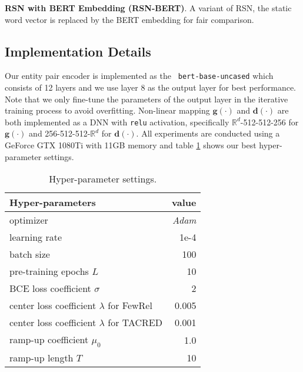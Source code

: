 \documentclass[11pt]{article}
\begin{document}
        \noindent\textbf{RSN with BERT Embedding (RSN-BERT)}. A variant of RSN, the static word vector is replaced by the BERT embedding for fair comparison.
        


    \subsection{Implementation Details}
        Our entity pair encoder is implemented as the \texttt{ bert-base-uncased} which consists of 12 layers and we use layer 8 as the output layer for best performance. Note that we only fine-tune the parameters of the output layer in the iterative training process to avoid overfitting. Non-linear mapping $\bm{g}(\cdot)$ and $\bm{d}(\cdot)$ are both implemented as a DNN with \texttt{relu} activation, specifically $\mathbb{R}^d$-512-512-256 for $\bm{g}(\cdot)$ and 256-512-512-$\mathbb{R}^d$ for $\bm{d}(\cdot)$. All experiments are conducted using a GeForce GTX 1080Ti with 11GB memory and table \ref{tab:hyper} shows our best hyper-parameter settings.
        \begin{table}
            \centering
            \begin{tabular}{lr}
            \toprule
            Hyper-parameters & value\\
            \midrule
            optimizer & \textit{Adam}\\
            learning rate & 1e-4\\
            batch size & 100\\
            \midrule
            pre-training epochs $L$ & 10\\
            BCE loss coefficient $\sigma$ & 2\\
            center loss coefficient $\lambda$ for FewRel & 0.005\\
            center loss coefficient $\lambda$ for TACRED & 0.001\\
            ramp-up coefficient $\mu_0$ & 1.0\\
            ramp-up length $T$ & 10\\
            \bottomrule
            \end{tabular}
            \caption{Hyper-parameter settings.}
            \label{tab:hyper}
        \end{table}
\end{document}
